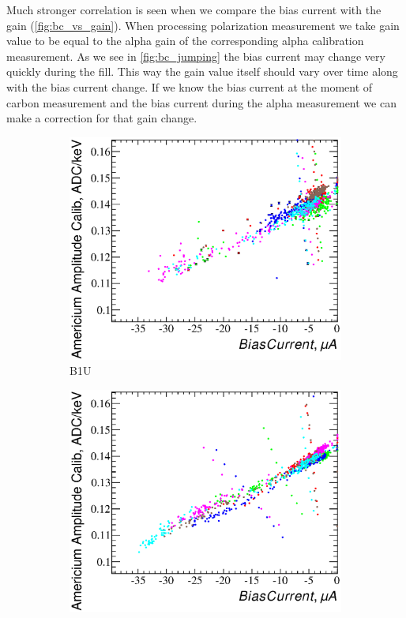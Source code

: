 \documentclass[a4paper,12pt]{article}
\begin{document}
Much stronger correlation is seen when we compare the bias current with the
gain (\cref{fig:bc_vs_gain}). When processing polarization measurement we take
gain value to be equal to the alpha gain of the corresponding alpha calibration
measurement.  As we see in \cref{fig:bc_jumping} the bias current may change
very quickly during the fill.  This way the gain value itself should vary over
time along with the bias current change.  If we know the bias current at the
moment of carbon measurement and the bias current during the alpha measurement
we can make a correction for that gain change.


\newcommand\bcvsgainlabel{Bias current versus americium gain ($\mu_{\text{Am}} /
E_{\text{Am}}$) dependency. The colors represent different detectors.}
\begin{figure}
\begin{subfigure}[b]{0.5\textwidth}
\includegraphics[width=\textwidth]{gfx/run13_alpha_study/B1U/c_hBiasCurrent_AmGain.eps}
\caption{B1U}\label{bc_vs_gain-b1u}
\end{subfigure}
\begin{subfigure}[b]{0.5\textwidth}
\includegraphics[width=\textwidth]{gfx/run13_alpha_study/Y1D/c_hBiasCurrent_AmGain.eps}

\end{subfigure}
\end{figure}
\end{document}
